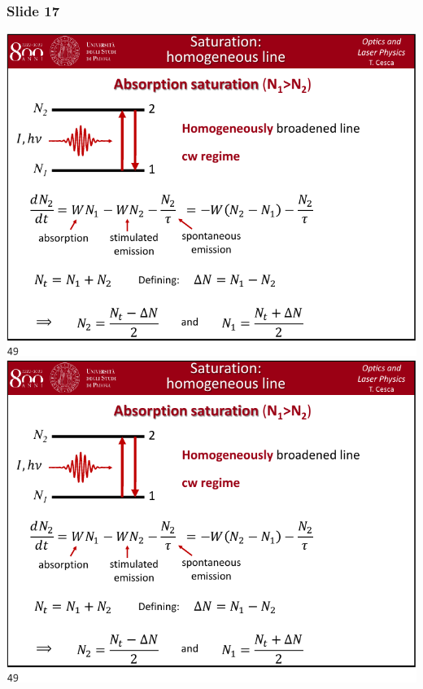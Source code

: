 \documentclass[../main/main.tex]{subfiles}
\begin{document}
\subsubsection*{Slide 17}

\begin{minipage}[]{0.5\linewidth}
\centering
\includegraphics[page=17,width=1\textwidth]{../lessons/pdf_file/10_lecture.pdf}
\includegraphics[page=18,width=1\textwidth]{../lessons/pdf_file/10_lecture.pdf}
\end{minipage}
\hspace{0.3cm}\vspace{0.3cm}
\end{document}
